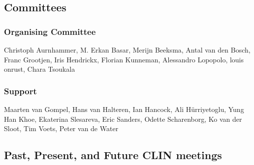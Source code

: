 \subsection{Committees}


\subsubsection{Organising Committee}
Christoph Aurnhammer, M. Erkan Basar, Merijn Beeksma, Antal van den Bosch, Franc Grootjen, Iris Hendrickx, Florian Kunneman, Alessandro Lopopolo, louis onrust, Chara Tsoukala

\subsubsection{Support}
Maarten van Gompel, Hans van Halteren, Ian Hancock, Ali Hürriyetoglu, Yung Han Khoe, Ekaterina Slesareva, Eric Sanders, Odette Scharenborg, Ko van der Sloot, Tim Voets, Peter van de Water 


\subsection{Past, Present, and Future CLIN meetings}
